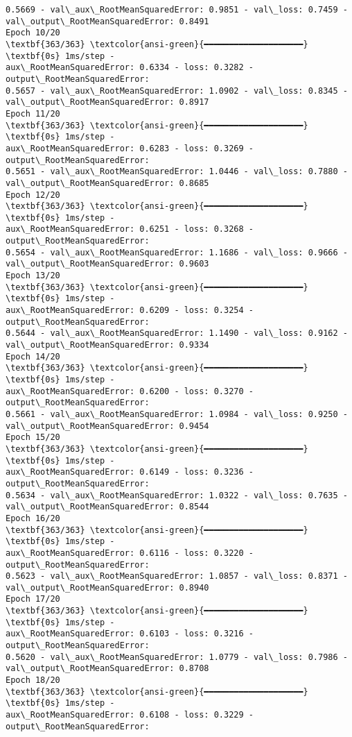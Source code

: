 \documentclass[12pt letter]{report}
\begin{document}
\begin{Verbatim}[commandchars=\\\{\}]
0.5669 - val\_aux\_RootMeanSquaredError: 0.9851 - val\_loss: 0.7459 -
val\_output\_RootMeanSquaredError: 0.8491
Epoch 10/20
\textbf{363/363} \textcolor{ansi-green}{━━━━━━━━━━━━━━━━━━━━} \textbf{0s} 1ms/step -
aux\_RootMeanSquaredError: 0.6334 - loss: 0.3282 - output\_RootMeanSquaredError:
0.5657 - val\_aux\_RootMeanSquaredError: 1.0902 - val\_loss: 0.8345 -
val\_output\_RootMeanSquaredError: 0.8917
Epoch 11/20
\textbf{363/363} \textcolor{ansi-green}{━━━━━━━━━━━━━━━━━━━━} \textbf{0s} 1ms/step -
aux\_RootMeanSquaredError: 0.6283 - loss: 0.3269 - output\_RootMeanSquaredError:
0.5651 - val\_aux\_RootMeanSquaredError: 1.0446 - val\_loss: 0.7880 -
val\_output\_RootMeanSquaredError: 0.8685
Epoch 12/20
\textbf{363/363} \textcolor{ansi-green}{━━━━━━━━━━━━━━━━━━━━} \textbf{0s} 1ms/step -
aux\_RootMeanSquaredError: 0.6251 - loss: 0.3268 - output\_RootMeanSquaredError:
0.5654 - val\_aux\_RootMeanSquaredError: 1.1686 - val\_loss: 0.9666 -
val\_output\_RootMeanSquaredError: 0.9603
Epoch 13/20
\textbf{363/363} \textcolor{ansi-green}{━━━━━━━━━━━━━━━━━━━━} \textbf{0s} 1ms/step -
aux\_RootMeanSquaredError: 0.6209 - loss: 0.3254 - output\_RootMeanSquaredError:
0.5644 - val\_aux\_RootMeanSquaredError: 1.1490 - val\_loss: 0.9162 -
val\_output\_RootMeanSquaredError: 0.9334
Epoch 14/20
\textbf{363/363} \textcolor{ansi-green}{━━━━━━━━━━━━━━━━━━━━} \textbf{0s} 1ms/step -
aux\_RootMeanSquaredError: 0.6200 - loss: 0.3270 - output\_RootMeanSquaredError:
0.5661 - val\_aux\_RootMeanSquaredError: 1.0984 - val\_loss: 0.9250 -
val\_output\_RootMeanSquaredError: 0.9454
Epoch 15/20
\textbf{363/363} \textcolor{ansi-green}{━━━━━━━━━━━━━━━━━━━━} \textbf{0s} 1ms/step -
aux\_RootMeanSquaredError: 0.6149 - loss: 0.3236 - output\_RootMeanSquaredError:
0.5634 - val\_aux\_RootMeanSquaredError: 1.0322 - val\_loss: 0.7635 -
val\_output\_RootMeanSquaredError: 0.8544
Epoch 16/20
\textbf{363/363} \textcolor{ansi-green}{━━━━━━━━━━━━━━━━━━━━} \textbf{0s} 1ms/step -
aux\_RootMeanSquaredError: 0.6116 - loss: 0.3220 - output\_RootMeanSquaredError:
0.5623 - val\_aux\_RootMeanSquaredError: 1.0857 - val\_loss: 0.8371 -
val\_output\_RootMeanSquaredError: 0.8940
Epoch 17/20
\textbf{363/363} \textcolor{ansi-green}{━━━━━━━━━━━━━━━━━━━━} \textbf{0s} 1ms/step -
aux\_RootMeanSquaredError: 0.6103 - loss: 0.3216 - output\_RootMeanSquaredError:
0.5620 - val\_aux\_RootMeanSquaredError: 1.0779 - val\_loss: 0.7986 -
val\_output\_RootMeanSquaredError: 0.8708
Epoch 18/20
\textbf{363/363} \textcolor{ansi-green}{━━━━━━━━━━━━━━━━━━━━} \textbf{0s} 1ms/step -
aux\_RootMeanSquaredError: 0.6108 - loss: 0.3229 - output\_RootMeanSquaredError:

\end{Verbatim}
\end{document}
